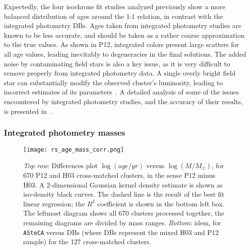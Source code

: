 \documentclass{aa}
\begin{document}
Expectedly, the four isochrone fit studies analyzed previously show a more
balanced distribution of ages around the 1:1 relation, in contrast with the
integrated photometry DBs. Ages taken from integrated photometry studies are
known to be less accurate, and should be taken as a rather coarse approximation
to the true values.
%
As shown in P12, integrated colors present large scatters for all age values,
leading inevitably to degeneracies in the final solutions.
The added noise by contaminating field stars is also a key issue, as it is
very difficult to remove properly from integrated photometry data. A
single overly bright field star can substantially modify the observed
cluster's luminosity, leading to incorrect estimates of its
parameters~\citep{Baumgardt_2013,Piatti_2014_B88}.
A detailed analysis of some of the issues encountered by integrated photometry
studies, and the accuracy of their results, is presented in~\cite{Anders_2013}.



\subsubsection{Integrated photometry masses}
\label{sssec:integ_photom_masses}
%
%
%
%

\begin{figure*}
\centering
\texttt{[image: rs\_age\_mass\_corr.png]}
\caption{\emph{Top row}: Differences plot $\log(age/yr)$ versus
$\log(M/M_{\odot})$, for 670 P12 and H03 cross-matched clusters, in the sense
P12 minus H03.
A 2-dimensional Gaussian kernel density estimate is shown as iso-density black
curves. The dashed line is the result of the best fit linear regression;
the $R^2$ coefficient is shown in the bottom left box.
The leftmost diagram shows all 670 clusters processed together, the remaining
diagrams are divided by mass ranges.
\emph{Bottom}: idem, for \texttt{ASteCA} versus DBs (where DBs represent the
mixed H03 and P12 sample) for the 127 cross-matched clusters.}
\label{fig:age_mass_corr}
\end{figure*}
\end{document}
